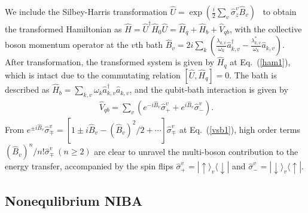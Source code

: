 \documentclass[twocolumn,preprintnumbers,amsmath,amssymb]{revtex4}
\begin{document}
We include the Silbey-Harris transformation $\hat{U}=\exp{(\frac{i}{2}\sum_{v}\hat{\sigma}^v_z\hat{B}_v)}$~\cite{rsilbey1984jcp,rharrris1985jcp} to obtain the transformed Hamiltonian as $\hat{H}=\hat{U}^{\dag}\hat{H}_0\hat{U}=\hat{H}_q+\hat{H}_b+\hat{V}_{qb}$,
with the collective boson momentum operator at the $v$th bath
$\hat{B}_v=2i\sum_{k}(\frac{\lambda_{k,v}}{\omega_k}\hat{a}^{\dag}_{k,v}-\frac{\lambda^{*}_{k,v}}{\omega_k}\hat{a}_{k,v})$.
After transformation, the transformed system is given by $\hat{H}_q$ at Eq.~(\ref{ham1}),
which is intact due to the commutating relation $[\hat{U},\hat{H}_q]=0$.
The bath is described as
$\hat{H}_b=\sum_{k,v}\omega_k\hat{a}^{\dag}_{k,v}\hat{a}_{k,v}$,
and the qubit-bath interaction is given by
\begin{eqnarray}~\label{vsb1}
\hat{V}_{qb}=\sum_v(e^{-i\hat{B}_v}\hat{\sigma}^v_++e^{i\hat{B}_v}\hat{\sigma}^v_-).
\end{eqnarray}
From
$e^{{\pm}i\hat{B}_v}\hat{\sigma}^v_{\mp}=[1{\pm}i\hat{B}_v-(\hat{B}_v)^2/2+{\cdots}]\hat{\sigma}^v_{\mp}$  at Eq.~(\ref{vsb1}),
high order terms $(\hat{B}_v)^n/n!\hat{\sigma}^v_{\mp}~(n{\ge}2)$ are clear to unravel the multi-boson contribution to the energy transfer, accompanied by the spin flips
$\hat{\sigma}^v_{+}=|\uparrow{\rangle}_v{\langle}\downarrow|$ and $\hat{\sigma}^v_{-}=|\downarrow{\rangle}_v{\langle}\uparrow|$.

\begin{comment}
\begin{figure}[tbp]
\texttt{[image: fig0b.eps]}
\caption{(Color online) All possible energy transfer processes based on the kinetic equation at Eq.~(\ref{p1}),
and $\kappa_{ij}$ describes the process from collective population state $\mathcal{P}_j$ to $\mathcal{P}_i$, shown at appendix A.
}~\label{fig0b}
\end{figure}
\end{comment}

\subsection{Nonequlibrium NIBA}
\end{document}
